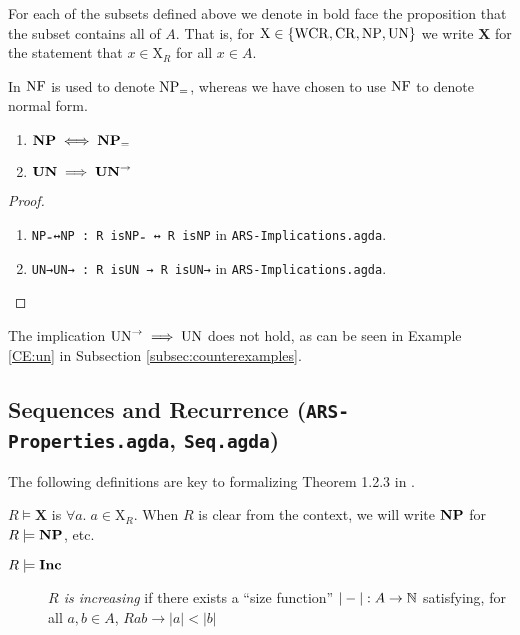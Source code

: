 For each of the subsets defined above we denote in bold face the proposition that the subset contains all of $A$.
That is, for $\mathrm{X} \in \{\mathrm{WCR} , \mathrm{CR} , \mathrm{NP} , \mathrm{UN} \}$ we write $\mathbf{X}$ for the statement that $x \in \mathrm{X}_R$ for all $x \in A$.


In \terese $\mathrm{NF}$ is used to denote $\mathrm{NP_=}$, whereas we have chosen to use $\mathrm{NF}$ to denote normal form. 

\begin{proposition}\hfill 
    \begin{enumerate}
        \item $\mathbf{NP} \iff \mathbf{NP_=}$ 
        \item $\mathbf{UN} \implies \mathbf{UN}^{\to}$
    \end{enumerate}
\end{proposition}
\begin{proof} \hfill
    \begin{enumerate}
        \item \verb|NP₌↔NP : R isNP₌ ↔ R isNP| in \texttt{ARS-Implications.agda}.
        \item \verb|UN→UN→ : R isUN → R isUN→| in \texttt{ARS-Implications.agda}. 
    \end{enumerate} 
\end{proof}

The implication $\mathrm{UN}^{\to} \implies \mathrm{UN}$ does not hold, as can be seen in Example \ref{CE:un} in Subsection \ref{subsec:counterexamples}.

\subsection{Sequences and Recurrence (\texttt{ARS-Properties.agda}, \texttt{Seq.agda})}
The following definitions are key to formalizing Theorem 1.2.3 in \terese.

\begin{notation}
    $R \models \mathbf{X}$ is $\forall a.\; a \in \mathrm{X}_R$. When $R$ is clear from the context, we will write $\mathbf{NP}$ for $R \models \mathbf{NP}$, etc. 
\end{notation}

\begin{definition} \hfill
    \begin{description}
        \item[$R \models \mathbf{Inc}$] \emph{$R$ is increasing} if there exists a ``size function'' $|-| : A \to \mathbb{N}$ satisfying, for all $a, b \in A$,
        $Rab \to |a| < |b|$  
    \end{description}
\end{definition}

